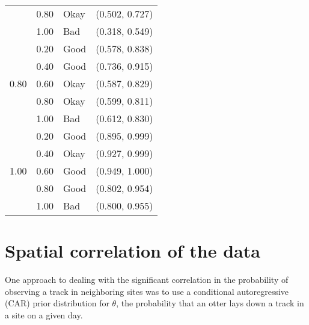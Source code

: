 \documentclass[12pt]{article}
\begin{document}
{\begin{tabular}{|l|l|l|l|}
            & \cellcolor{Yellow}0.80 & \cellcolor{Yellow}Okay &
              \cellcolor{Yellow}(0.502, 0.727) \\
            & \cellcolor{Red}1.00 & \cellcolor{Red}Bad &
              \cellcolor{Red}(0.318, 0.549) \\
        \hline
        \multirow{5}{*}{0.80}
            & \cellcolor{Green}0.20 & \cellcolor{Green}Good &
              \cellcolor{Green}(0.578, 0.838) \\
            & \cellcolor{Green}0.40 & \cellcolor{Green}Good &
              \cellcolor{Green}(0.736, 0.915) \\
            & \cellcolor{Yellow}0.60 & \cellcolor{Yellow}Okay &
              \cellcolor{Yellow}(0.587, 0.829) \\
            & \cellcolor{Yellow}0.80 & \cellcolor{Yellow}Okay &
              \cellcolor{Yellow}(0.599, 0.811) \\
            & \cellcolor{Red}1.00 & \cellcolor{Red}Bad &
              \cellcolor{Red}(0.612, 0.830) \\
        \hline
        \multirow{5}{*}{1.00}
            & \cellcolor{Yellow}0.20 & \cellcolor{Yellow}Good &
              \cellcolor{Yellow}(0.895, 0.999) \\
            & \cellcolor{Yellow}0.40 & \cellcolor{Yellow}Okay &
              \cellcolor{Yellow}(0.927, 0.999) \\
            & \cellcolor{Green}0.60 & \cellcolor{Green}Good &
              \cellcolor{Green}(0.949, 1.000) \\
            & \cellcolor{Yellow}0.80 & \cellcolor{Yellow}Good &
              \cellcolor{Yellow}(0.802, 0.954) \\
            & \cellcolor{Red}1.00 & \cellcolor{Red}Bad &
              \cellcolor{Red}(0.800, 0.955) \\
        \hline
    \end{tabular}}

\section{Spatial correlation of the data}
One approach to dealing with the significant correlation in the probability of
observing a track in neighboring sites was to use a conditional autoregressive
(CAR) prior distribution for $\theta$, the probability that an otter lays down a
track in a site on a given day.
\end{document}
